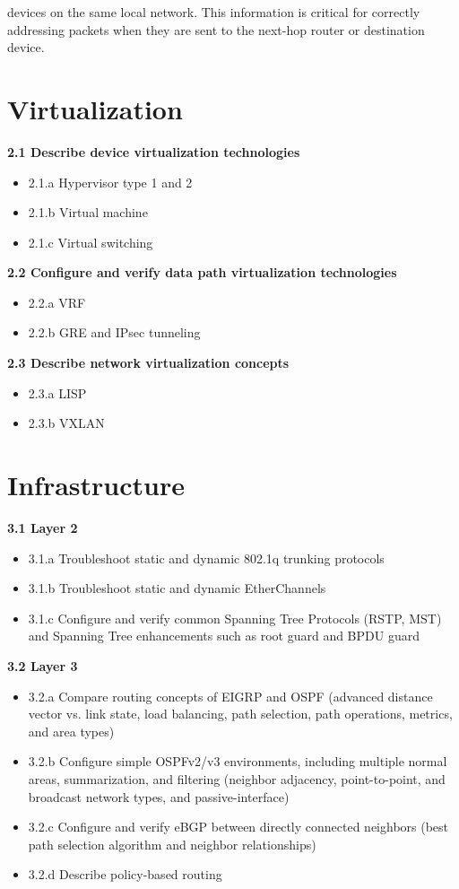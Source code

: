 \documentclass{article}
\begin{document}
devices on the same local network. This information is critical for correctly addressing packets when they are sent to the next-hop router or destination device.\\

\section{Virtualization}
\textbf{2.1 Describe device virtualization technologies}
\begin{itemize}
\item 2.1.a Hypervisor type 1 and 2
\item 2.1.b Virtual machine
\item 2.1.c Virtual switching
\end{itemize}

\textbf{2.2 Configure and verify data path virtualization technologies}
\begin{itemize}
\item 2.2.a VRF
\item 2.2.b GRE and IPsec tunneling
\end{itemize}

\textbf{2.3 Describe network virtualization concepts}
\begin{itemize}
\item 2.3.a LISP
\item 2.3.b VXLAN
\end{itemize}

\section{Infrastructure}
\textbf{3.1 Layer 2}
\begin{itemize}
\item 3.1.a Troubleshoot static and dynamic 802.1q trunking protocols
\item 3.1.b Troubleshoot static and dynamic EtherChannels
\item 3.1.c Configure and verify common Spanning Tree Protocols (RSTP, MST) and Spanning Tree enhancements such as root guard and BPDU guard
\end{itemize}

\textbf{3.2 Layer 3}
\begin{itemize}
\item 3.2.a Compare routing concepts of EIGRP and OSPF (advanced distance vector vs. link state, load balancing, path selection, path operations, metrics, and area types)
\item 3.2.b Configure simple OSPFv2/v3 environments, including multiple normal areas, summarization, and filtering (neighbor adjacency, point-to-point, and broadcast network types, and passive-interface)
\item 3.2.c Configure and verify eBGP between directly connected neighbors (best path selection algorithm and neighbor relationships)
\item 3.2.d Describe policy-based routing
\end{itemize}
\end{document}
